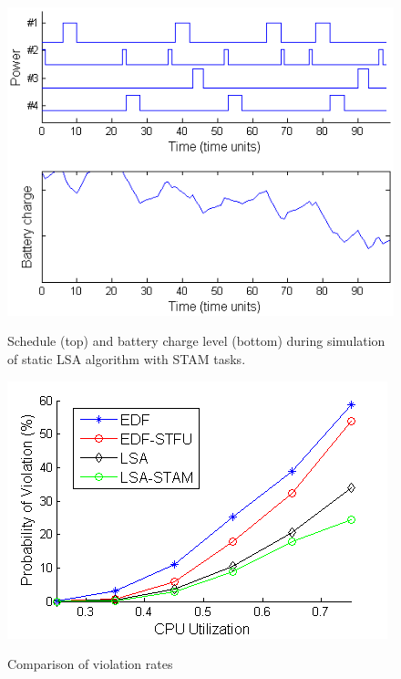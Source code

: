 \begin{figure}[tb]
\begin{center}
\includegraphics[scale=0.57]{lsastambattery.png}
\label{fig:lsastambattery}
\caption{Schedule (top) and battery charge level (bottom) during simulation of static LSA algorithm with STAM tasks.}
\end{center}
\end{figure}

\begin{figure}[tb]
\begin{center}
\includegraphics[scale=0.57]{violations_vs_cpuutil.png}
\label{fig:violations_vs_cpuutil}
\caption{Comparison of violation rates}
\end{center}
\end{figure}

